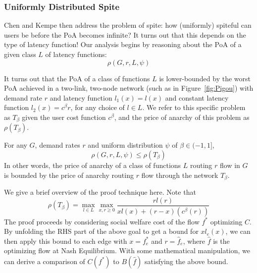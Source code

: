 \subsubsection{Uniformly Distributed Spite}
Chen and Kempe then address the problem of spite: how (uniformly) spiteful can users be before the PoA becomes infinite?
It turns out that this depends on the type of latency function! Our analysis begins by reasoning about the PoA of a given class ${L}$ of latency functions: 
$$\rho(G,r,{L},\psi)$$ 

It turns out that the PoA of a class of functions $L$ is lower-bounded by the worst PoA achieved in a two-link, two-node network (such as in Figure~\ref{fig:Pigou}) with demand rate $r$ and latency function $l_1(x) = l(x)$ and constant latency function $l_2(x) = c^\beta{r}$, for any choice of $l \in L$. We refer to this specific problem as $T_\beta$ given the user cost function $c^\beta$, and the price of anarchy of this problem as $\rho(T_\beta)$.
\begin{theorem}
For any $G$, demand rates $r$ and uniform distribution $\psi$ of $\beta \in (-1, 1]$,
    $$\rho(G,r,{L},\psi) \le \rho(T_\beta)$$
    In other words, the price of anarchy of a class of functions $L$ routing $r$ flow in $G$ is 
    bounded by the price of anarchy routing $r$ flow through the network $T_\beta$.
    \end{theorem}
\begin{proof-sketch}
    We give a brief overview of the proof technique here.
    Note that $$\rho(T_\beta) = \max_{l\in{L}} \max_{x,r\ge 0} \frac{rl(r)}{xl(x) + (r-x)(c^\beta(r))}$$
    The proof proceeds by considering social welfare cost of the flow $f^*$ optimizing $C$. By unfolding the RHS part of the above goal to get a bound for $xl_e(x)$, we can then apply this bound to each edge with $x = f^*_e$ and $r = \hat{f}_e$, where $\hat{f}$ is the optimizing flow at Nash Equilibrium. With some mathematical manipulation, we can derive a comparison of $C(f^*)$ to $B(\hat{f})$ satisfying the above bound.
\end{proof-sketch}

